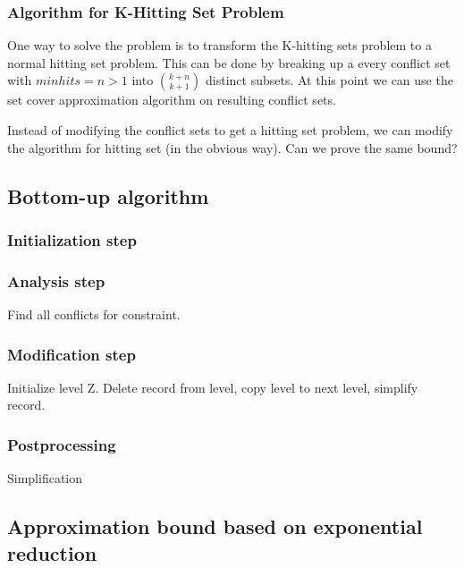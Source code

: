 \subsubsection{Algorithm for K-Hitting Set Problem}

One way to solve the problem is to transform the K-hitting sets problem to a normal hitting set problem. This can be done by breaking up a every conflict set with $minhits=n>1$ into $k+n \choose k+1$ distinct subsets. At this point we can use the set cover approximation algorithm on resulting conflict sets.

Instead of modifying the conflict sets to get a hitting set problem, we can modify the algorithm for hitting set (in the obvious way). Can we prove the same bound?

\subsection{Bottom-up algorithm}

\subsubsection{Initialization step}

\subsubsection{Analysis step}

Find all conflicts for constraint.

\subsubsection{Modification step}

Initialize level Z. Delete record from level, copy level to next level, simplify record.

\subsubsection{Postprocessing}

Simplification


\subsection{Approximation bound based on exponential reduction}
